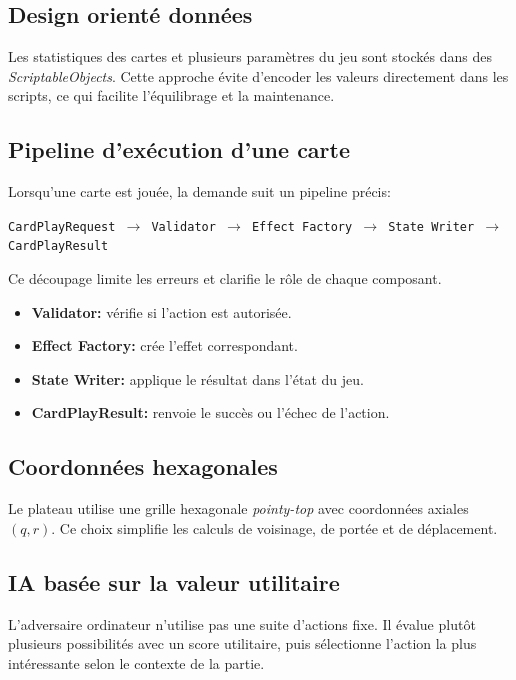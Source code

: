 \documentclass[12pt,a4paper]{article}
\begin{document}
\subsection{Design orienté données}
Les statistiques des cartes et plusieurs paramètres du jeu sont stockés dans des \textit{ScriptableObjects}. Cette approche évite d'encoder les valeurs directement dans les scripts, ce qui facilite l'équilibrage et la maintenance.

\subsection{Pipeline d'exécution d'une carte}
Lorsqu'une carte est jouée, la demande suit un pipeline précis:

\begin{center}
\texttt{CardPlayRequest $\rightarrow$ Validator $\rightarrow$ Effect Factory $\rightarrow$ State Writer $\rightarrow$ CardPlayResult}
\end{center}

Ce découpage limite les erreurs et clarifie le rôle de chaque composant.

\begin{itemize}[leftmargin=1.2cm]
    \item \textbf{Validator:} vérifie si l'action est autorisée.
    \item \textbf{Effect Factory:} crée l'effet correspondant.
    \item \textbf{State Writer:} applique le résultat dans l'état du jeu.
    \item \textbf{CardPlayResult:} renvoie le succès ou l'échec de l'action.
\end{itemize}

\subsection{Coordonnées hexagonales}
Le plateau utilise une grille hexagonale \textit{pointy-top} avec coordonnées axiales $(q, r)$. Ce choix simplifie les calculs de voisinage, de portée et de déplacement.

\subsection{IA basée sur la valeur utilitaire}
L'adversaire ordinateur n'utilise pas une suite d'actions fixe. Il évalue plutôt plusieurs possibilités avec un score utilitaire, puis sélectionne l'action la plus intéressante selon le contexte de la partie.
\end{document}
